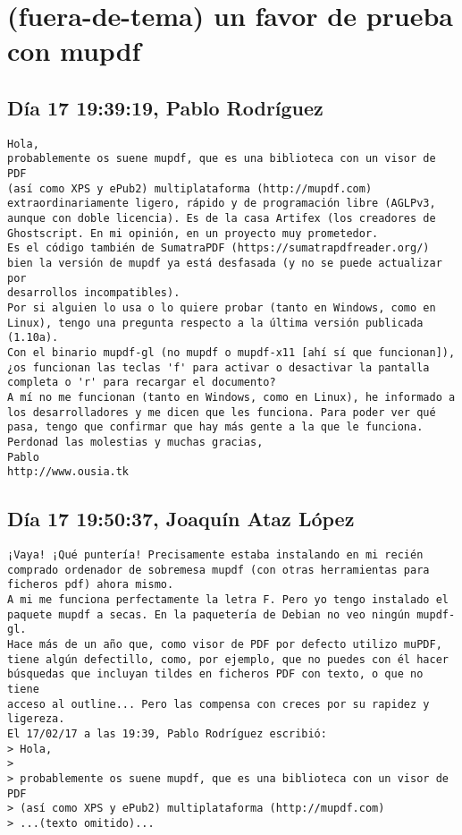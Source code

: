 \documentclass[a4paper,10pt]{article}
\begin{document}
\section{(fuera-de-tema) un favor de prueba con mupdf}

\subsection{Día 17 19:39:19, Pablo Rodríguez}

\begin{lstlisting}
Hola,
probablemente os suene mupdf, que es una biblioteca con un visor de PDF
(así como XPS y ePub2) multiplataforma (http://mupdf.com)
extraordinariamente ligero, rápido y de programación libre (AGLPv3,
aunque con doble licencia). Es de la casa Artifex (los creadores de
Ghostscript. En mi opinión, en un proyecto muy prometedor.
Es el código también de SumatraPDF (https://sumatrapdfreader.org/)
bien la versión de mupdf ya está desfasada (y no se puede actualizar por
desarrollos incompatibles).
Por si alguien lo usa o lo quiere probar (tanto en Windows, como en
Linux), tengo una pregunta respecto a la última versión publicada (1.10a).
Con el binario mupdf-gl (no mupdf o mupdf-x11 [ahí sí que funcionan]),
¿os funcionan las teclas 'f' para activar o desactivar la pantalla
completa o 'r' para recargar el documento?
A mí no me funcionan (tanto en Windows, como en Linux), he informado a
los desarrolladores y me dicen que les funciona. Para poder ver qué
pasa, tengo que confirmar que hay más gente a la que le funciona.
Perdonad las molestias y muchas gracias,
Pablo
http://www.ousia.tk

\end{lstlisting}

\subsection{Día 17 19:50:37, Joaquín Ataz López}

\begin{lstlisting}
¡Vaya! ¡Qué puntería! Precisamente estaba instalando en mi recién 
comprado ordenador de sobremesa mupdf (con otras herramientas para 
ficheros pdf) ahora mismo.
A mi me funciona perfectamente la letra F. Pero yo tengo instalado el 
paquete mupdf a secas. En la paquetería de Debian no veo ningún mupdf-gl.
Hace más de un año que, como visor de PDF por defecto utilizo muPDF, 
tiene algún defectillo, como, por ejemplo, que no puedes con él hacer 
búsquedas que incluyan tildes en ficheros PDF con texto, o que no tiene 
acceso al outline... Pero las compensa con creces por su rapidez y ligereza.
El 17/02/17 a las 19:39, Pablo Rodríguez escribió:
> Hola,
>
> probablemente os suene mupdf, que es una biblioteca con un visor de PDF
> (así como XPS y ePub2) multiplataforma (http://mupdf.com)
> ...(texto omitido)...

\end{lstlisting}
\end{document}
